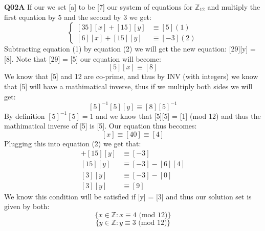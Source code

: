 \documentclass[11pt]{article}
\begin{document}
\parindent=0pt

\textbf{Q02A} If our we set [a] to be [7] our system of equations for $\mathbb Z_{12}$ and multiply the first equation by 5 and the second by 3 we get:
$$
\begin{cases}
[35][x] + [15][y] & \equiv [5]       (1)\\
[6][x] + [15][y] & \equiv [-3]      (2)
\end{cases}
$$
Subtracting equation (1) by equation (2) we will get the new equation: [29][y] = [8]. Note that [29] = [5] our equation will become:
\[ [5][x] \equiv [8] \]
We know that [5] and 12 are co-prime, and thus by INV (with integers) we know that [5] will have a mathimatical inverse, thus if we multiply both sides we will get:
\[ [5]^{-1}[5][y] \equiv [8][5]^{-1} \]
By definition $[5]^{-1}[5] = 1$ and we know that [5][5] = [1] (mod 12) and thus the mathimatical inverse of [5] is [5]. Our equation thus becomes:
\[ [x] \equiv [40] \equiv [4] \]
Plugging this into equation (2) we get that:
\begin{align*}
 [6][x] + [15][y] & \equiv [-3]  \\
 [15][y]  & \equiv [-3]  - [6][4] \\
 [3][y]  & \equiv [-3]  - [0] \\
 [3][y]  & \equiv [9]
\end{align*}
We know this condition will be satisfied if [y] = [3] and thus our solution set is given by both: 
\[  \{ x \in \mathbb{Z} : x \equiv 4 \text{  (mod 12)} \} \]
\[  \{ y \in \mathbb{Z} : y \equiv 3 \text{  (mod 12)} \} \]
\end{document}
